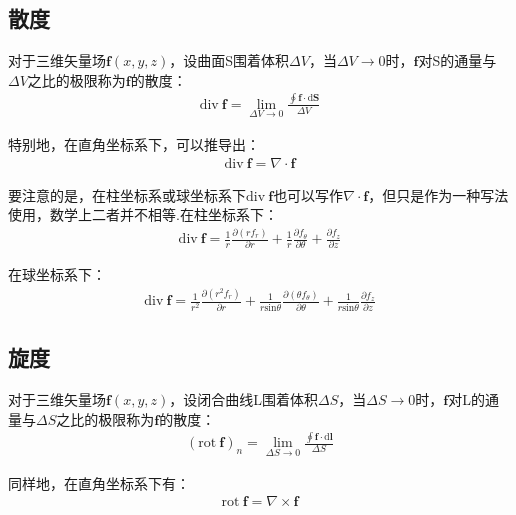 \documentclass[main.tex]{subfiles}
\begin{document}
\subsection{散度}
对于三维矢量场$\boldsymbol{f}(x,y,z)$，设曲面S围着体积$\Delta V$，当$\Delta V \to 0$时，$\boldsymbol{f}$对S的通量与$\Delta V$之比的极限称为$\boldsymbol{f}$的散度：
\begin{align}
    \mathrm{div}\ \boldsymbol{f} = \lim_{\Delta V \to 0} \frac{\displaystyle \oint \boldsymbol{f}\cdot \mathrm{d}\boldsymbol{S}}{\Delta V}
\end{align}

特别地，在直角坐标系下，可以推导出：
\begin{align}
    \mathrm{div}\ \boldsymbol{f} = \nabla \cdot \boldsymbol{f}
\end{align}

要注意的是，在柱坐标系或球坐标系下$\mathrm{div}\ \boldsymbol{f}$也可以写作$\nabla \cdot \boldsymbol{f}$，但只是作为一种写法使用，数学上二者并不相等.在柱坐标系下：
\begin{align}
    \mathrm{div}\ \boldsymbol{f} = \frac{1}{r}\frac{\partial (rf_r)}{\partial r}+\frac{1}{r} \frac{\partial f_\theta}{\partial \theta}+\frac{\partial f_z}{\partial z}
\end{align}

在球坐标系下：
\begin{align}
    \mathrm{div}\ \boldsymbol{f} = \frac{1}{r^2}\frac{\partial (r^2f_r)}{\partial r}+\frac{1}{r\mathrm{sin}\theta } \frac{\partial (\theta f_\theta)}{\partial \theta}+\frac{1}{r\mathrm{sin}\theta }\frac{\partial f_z}{\partial z}
\end{align}

\subsection{旋度}
对于三维矢量场$\boldsymbol{f}(x,y,z)$，设闭合曲线L围着体积$\Delta S$，当$\Delta S \to 0$时，$\boldsymbol{f}$对L的通量与$\Delta S$之比的极限称为$\boldsymbol{f}$的散度：
\begin{align}
    (\mathrm{rot}\ \boldsymbol{f})_n = \lim_{\Delta S \to 0} \frac{\displaystyle \oint \boldsymbol{f}\cdot \mathrm{d}\boldsymbol{l}}{\Delta S}
\end{align}

同样地，在直角坐标系下有：
\begin{align}
    \mathrm{rot}\ \boldsymbol{f} = \nabla \times \boldsymbol{f}
\end{align}
\end{document}
